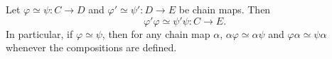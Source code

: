 Let $\varphi \simeq \psi : C \to D$ and $\varphi' \simeq \psi' : D \to E$ be chain maps. Then
$$\varphi' \varphi \simeq \psi' \psi : C \to E.$$
In particular, if $\varphi \simeq \psi$, then for any chain map $\alpha$, $\alpha \varphi \simeq \alpha \psi$ and $\varphi \alpha \simeq \psi \alpha$ whenever the compositions are defined.